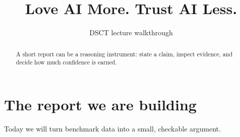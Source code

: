 \documentclass{article}
\title{Love AI More. Trust AI Less.}\author{DSCT lecture walkthrough}\date{}
\begin{document}
\maketitle
\begin{abstract}A short report can be a reasoning instrument: state a claim, inspect evidence, and decide how much confidence is earned.\end{abstract}
\section{The report we are building}Today we will turn benchmark data into a small, checkable argument.
\end{document}
